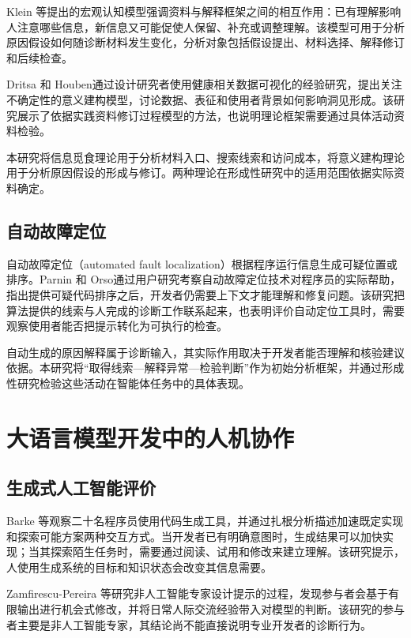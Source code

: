Klein 等\cite{ref11}提出的宏观认知模型强调资料与解释框架之间的相互作用：已有理解影响人注意哪些信息，新信息又可能促使人保留、补充或调整理解。该模型可用于分析原因假设如何随诊断材料发生变化，分析对象包括假设提出、材料选择、解释修订和后续检查。

Dritsa 和 Houben\cite{ref57}通过设计研究者使用健康相关数据可视化的经验研究，提出关注不确定性的意义建构模型，讨论数据、表征和使用者背景如何影响洞见形成。该研究展示了依据实践资料修订过程模型的方法，也说明理论框架需要通过具体活动资料检验。

本研究将信息觅食理论用于分析材料入口、搜索线索和访问成本，将意义建构理论用于分析原因假设的形成与修订。两种理论在形成性研究中的适用范围依据实际资料确定。

\subsection{自动故障定位}

自动故障定位（automated fault localization）根据程序运行信息生成可疑位置或排序。Parnin 和 Orso\cite{ref35}通过用户研究考察自动故障定位技术对程序员的实际帮助，指出提供可疑代码排序之后，开发者仍需要上下文才能理解和修复问题。该研究把算法提供的线索与人完成的诊断工作联系起来，也表明评价自动定位工具时，需要观察使用者能否把提示转化为可执行的检查。

自动生成的原因解释属于诊断输入，其实际作用取决于开发者能否理解和核验建议依据。本研究将“取得线索—解释异常—检验判断”作为初始分析框架，并通过形成性研究检验这些活动在智能体任务中的具体表现。

\section{大语言模型开发中的人机协作}

\subsection{生成式人工智能评价}

Barke 等\cite{ref64}观察二十名程序员使用代码生成工具，并通过扎根分析描述加速既定实现和探索可能方案两种交互方式。当开发者已有明确意图时，生成结果可以加快实现；当其探索陌生任务时，需要通过阅读、试用和修改来建立理解。该研究提示，人使用生成系统的目标和知识状态会改变其信息需要。

Zamfirescu-Pereira 等\cite{ref65}研究非人工智能专家设计提示的过程，发现参与者会基于有限输出进行机会式修改，并将日常人际交流经验带入对模型的判断。该研究的参与者主要是非人工智能专家，其结论尚不能直接说明专业开发者的诊断行为。

